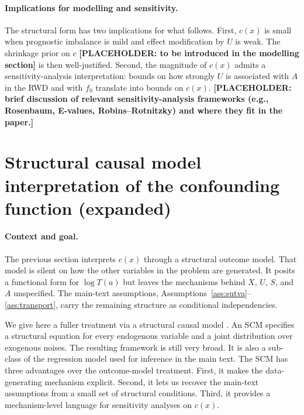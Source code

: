 \paragraph{Implications for modelling and sensitivity.}
The structural form has two implications for what follows.
First, $c(x)$ is small when prognostic imbalance is mild and effect modification by $U$ is weak.
The shrinkage prior on $c$ \textbf{[PLACEHOLDER: to be introduced in the modelling section]} is then well-justified.
Second, the magnitude of $c(x)$ admits a sensitivity-analysis interpretation: bounds on how strongly $U$ is associated with $A$ in the RWD and with $f_0$ translate into bounds on $c(x)$.
\textbf{[PLACEHOLDER: brief discussion of relevant sensitivity-analysis frameworks (e.g., Rosenbaum, E-values, Robins--Rotnitzky) and where they fit in the paper.]}



\newpage
\section{Structural causal model interpretation of the confounding function (expanded)}\label{sm:scm-full}

\paragraph{Context and goal.}
The previous section interprets $c(x)$ through a structural outcome model.
That model is silent on how the other variables in the problem are generated.
It posits a functional form for $\log T(a)$ but leaves the mechanisms behind $X$, $U$, $S$, and $A$ unspecified.
The main-text assumptions, Assumptions~\ref{ass:sutva}--\ref{ass:transport}, carry the remaining structure as conditional independencies.

We give here a fuller treatment via a structural causal model \citep[SCM;][]{pearl2009causality, peters2017elements}.
An SCM specifies a structural equation for every endogenous variable and a joint distribution over exogenous noises.
The resulting framework is still very broad.
It is also a sub-class of the regression model used for inference in the main text.
The SCM has three advantages over the outcome-model treatment.
First, it makes the data-generating mechanism explicit.
Second, it lets us recover the main-text assumptions from a small set of structural conditions.
Third, it provides a mechanism-level language for sensitivity analyses on $c(x)$.


